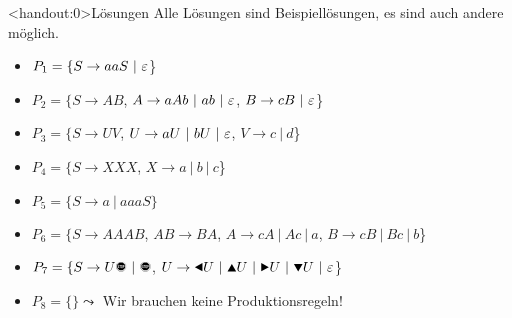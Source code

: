 {
\begin{frame}<handout:0>{Lösungen}
Alle Lösungen sind Beispiellösungen, es sind auch andere möglich.
    \begin{itemize}
        \item<1-> \alert<1>{$P_1 = \{S\rightarrow aaS\ |\ \varepsilon$\}}
        \item<2-> \alert<2>{$P_2 = \{S\rightarrow AB$, $A\rightarrow aAb \ |\  ab \ |\ \emptyWord$, $B\rightarrow cB \ |\  \emptyWord$\}}
        \item<3-> \alert<3>{$P_3 = \{S\rightarrow UV$, $U\rightarrow aU \ |\  bU \ |\  \emptyWord$, $V\rightarrow c \ |\  d$\}}
        \item<4-> \alert<4>{$P_4 = \{S\rightarrow XXX$, $X\rightarrow a \ |\  b \ |\  c$\}}
        \item<5-> \alert<5>{$P_5 = \{S\rightarrow a \ |\  aaaS\}$}
        \item<6-> \alert<6>{$P_6 = \{S\rightarrow AAAB$, $AB\rightarrow BA$, 
        $A\rightarrow cA \ |\  Ac \ |\  a$, 
        $B\rightarrow cB \ |\  Bc \ |\  b$\}}
        \item<7-> \alert<7>{$P_7 = \{S\rightarrow U\text{\Stopsign} \ |\  \text{\Stopsign}$, $U\rightarrow \text{\Rewind} U \ |\  \text{\MoveUp} U \ |\  \text{\Forward} U \ |\  \text{\MoveDown} U \ |\ \emptyWord$\}}
        \item<8-> \alert<8>{$P_8 = \{\} \leadsto$ Wir brauchen keine Produktionsregeln!}
    \end{itemize}
\end{frame}
}  
